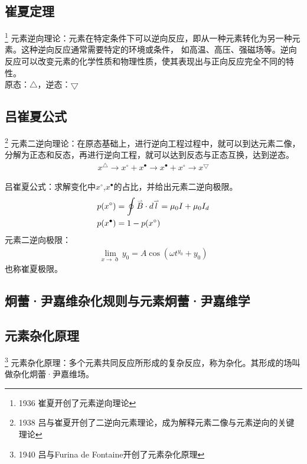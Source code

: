 \documentclass[12pt,a4paper]{article}%
\begin{document}
\subsection{崔夏定理}\footnote[18]{1936 崔夏开创了元素逆向理论}
元素逆向理论：元素在特定条件下可以逆向反应，即从一种元素转化为另一种元素。这种逆向反应通常需要特定的环境或条件，
如高温、高压、强磁场等。逆向反应可以改变元素的化学性质和物理性质，使其表现出与正向反应完全不同的特性。
\\
原态：$\bigtriangleup$，逆态：$\bigtriangledown $

\subsection{吕崔夏公式}\footnote[19]{1938 吕与崔夏开创了二逆向元素理论，成为解释元素二像与元素逆向的关键理论}
元素二逆向理论：在原态基础上，进行逆向工程过程中，就可以到达元素二像，分解为正态和反态，再进行逆向工程，就可以达到反态与正态互换，达到逆态。
\begin{align}
	x^\bigtriangleup  \longrightarrow x^{\circ } +x^{\bullet } \longrightarrow x^{\bullet }+x^{\circ }\longrightarrow x^{\bigtriangledown } 
\end{align}

吕崔夏公式：求解变化中$ x^{\circ } $,$x^{\bullet }$的占比，并给出元素二逆向极限。
\begin{align}
	&p(x^{\circ })  =\oint { \mathord{ \buildrel{ \lower3pt \hbox{$ \scriptscriptstyle \rightharpoonup$}} \over B} \cdot {d \mathord{ \buildrel{ \lower3pt \hbox{$ \scriptscriptstyle \rightharpoonup$}} \over l}}  = { \mu _0}} I + { \mu _0}{I_d} \\
	&p(x^\bullet )  = 1-p(x^\circ )
	\end{align}
元素二逆向极限：
\begin{eqnarray}
	\lim_{x \to \eth } {y_0} = A \cos ( \omega {t^{y_0}} + {y _0}) 
	\end{eqnarray}
也称崔夏极限。

	\begin{center}
		\section{炯蕾·尹嘉维杂化规则与元素炯蕾·尹嘉维学}
		\end{center}
	


	\subsection{元素杂化原理}\footnote[20]{1940 吕与Furina de Fontaine开创了元素杂化原理}
	元素杂化原理：多个元素共同反应所形成的复杂反应，称为杂化。其形成的场叫做杂化炯蕾·尹嘉维场。
\end{document}
